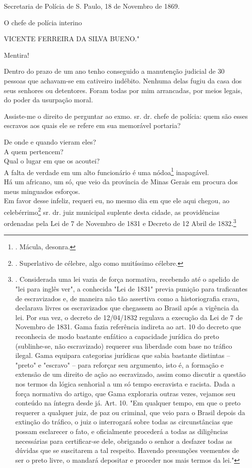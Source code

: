 Secretaria de Polícia de S. Paulo, 18 de Novembro de 1869.

O chefe de polícia interino

VICENTE FERREIRA DA SILVA BUENO."

Mentira!

Dentro do prazo de um ano tenho conseguido a manutenção judicial de 30
pessoas que achavam-se em cativeiro indébito. Nenhuma delas fugiu da
casa dos seus senhores ou detentores. Foram todas por mim arrancadas,
por meios legais, do poder da usurpação moral.

Assiste-me o direito de perguntar ao exmo. sr. dr. chefe de polícia:
quem são esses escravos aos quais ele se refere em sua memorável
portaria?

De onde e quando vieram eles?\\
A quem pertencem?\\
Qual o lugar em que os acoutei?\\
A falta de verdade em um alto funcionário é uma nódoa\footnote{. Mácula,
  desonra.} inapagável.\\
Há um africano, um só, que veio da província de Minas Gerais em procura
dos meus minguados esforços.\\
Em favor desse infeliz, requeri eu, no mesmo dia em que ele aqui chegou,
ao celebérrimo\footnote{. Superlativo de célebre, algo como muitíssimo
  célebre.} sr. dr. juiz municipal suplente desta cidade, as
providências ordenadas pela Lei de 7 de Novembro de 1831 e Decreto de 12
Abril de 1832.\footnote{. Considerada uma lei vazia de força normativa,
  recebendo até o apelido de "lei para inglês ver", a conhecida "Lei de
  1831" previa punição para traficantes de escravizados e, de maneira
  não tão assertiva como a historiografia crava, declarava livres os
  escravizados que chegassem ao Brasil após a vigência da lei. Por sua
  vez, o decreto de 12/04/1832 regulava a execução da Lei de 7 de
  Novembro de 1831. Gama fazia referência indireta ao art. 10 do decreto
  que reconhecia de modo bastante enfático a capacidade jurídica do
  preto (sublinhe-se, não escravizado) requerer sua liberdade com base
  no tráfico ilegal. Gama equipara categorias jurídicas que sabia
  bastante distintas -- "preto" e "escravo" -- para reforçar seu
  argumento, isto é, a formação e extensão de um direito de ação ao
  escravizado, assim como discutir a questão nos termos da lógica
  senhorial a um só tempo escravista e racista. Dada a força normativa
  do artigo, que Gama exploraria outras vezes, vejamos seu conteúdo na
  íntegra desde já. Art. 10. "Em qualquer tempo, em que o preto requerer
  a qualquer juiz, de paz ou criminal, que veio para o Brasil depois da
  extinção do tráfico, o juiz o interrogará sobre todas as
  circunstâncias que possam esclarecer o fato, e oficialmente procederá
  a todas as diligências necessárias para certificar-se dele, obrigando
  o senhor a desfazer todas as dúvidas que se suscitarem a tal respeito.
  Havendo presunções veementes de ser o preto livre, o mandará depositar
  e proceder nos mais termos da lei."}

